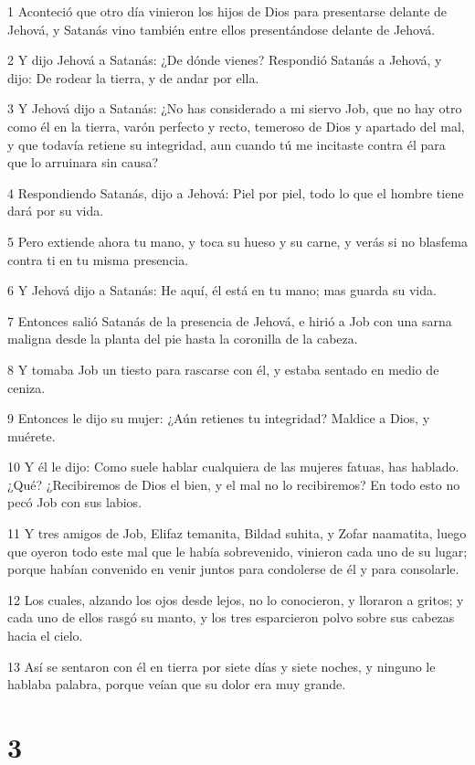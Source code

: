 \par 1 Aconteció que otro día vinieron los hijos de Dios para presentarse delante de Jehová, y Satanás vino también entre ellos presentándose delante de Jehová.
\par 2 Y dijo Jehová a Satanás: ¿De dónde vienes? Respondió Satanás a Jehová, y dijo: De rodear la tierra, y de andar por ella.
\par 3 Y Jehová dijo a Satanás: ¿No has considerado a mi siervo Job, que no hay otro como él en la tierra, varón perfecto y recto, temeroso de Dios y apartado del mal, y que todavía retiene su integridad, aun cuando tú me incitaste contra él para que lo arruinara sin causa?
\par 4 Respondiendo Satanás, dijo a Jehová: Piel por piel, todo lo que el hombre tiene dará por su vida.
\par 5 Pero extiende ahora tu mano, y toca su hueso y su carne, y verás si no blasfema contra ti en tu misma presencia.
\par 6 Y Jehová dijo a Satanás: He aquí, él está en tu mano; mas guarda su vida.
\par 7 Entonces salió Satanás de la presencia de Jehová, e hirió a Job con una sarna maligna desde la planta del pie hasta la coronilla de la cabeza.
\par 8 Y tomaba Job un tiesto para rascarse con él, y estaba sentado en medio de ceniza.
\par 9 Entonces le dijo su mujer: ¿Aún retienes tu integridad? Maldice a Dios, y muérete.
\par 10 Y él le dijo: Como suele hablar cualquiera de las mujeres fatuas, has hablado. ¿Qué? ¿Recibiremos de Dios el bien, y el mal no lo recibiremos? En todo esto no pecó Job con sus labios.
\par 11 Y tres amigos de Job, Elifaz temanita, Bildad suhita, y Zofar naamatita, luego que oyeron todo este mal que le había sobrevenido, vinieron cada uno de su lugar; porque habían convenido en venir juntos para condolerse de él y para consolarle.
\par 12 Los cuales, alzando los ojos desde lejos, no lo conocieron, y lloraron a gritos; y cada uno de ellos rasgó su manto, y los tres esparcieron polvo sobre sus cabezas hacia el cielo.
\par 13 Así se sentaron con él en tierra por siete días y siete noches, y ninguno le hablaba palabra, porque veían que su dolor era muy grande.

\chapter{3}

